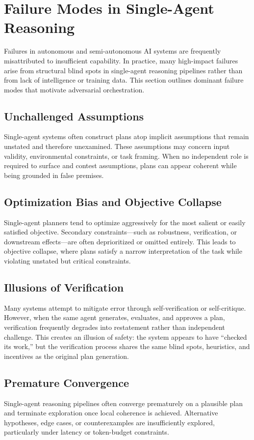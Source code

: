 \section{Failure Modes in Single-Agent Reasoning}

Failures in autonomous and semi-autonomous AI systems are frequently misattributed to insufficient capability. In practice, many high-impact failures arise from structural blind spots in single-agent reasoning pipelines rather than from lack of intelligence or training data. This section outlines dominant failure modes that motivate adversarial orchestration.

\subsection{Unchallenged Assumptions}
Single-agent systems often construct plans atop implicit assumptions that remain unstated and therefore unexamined. These assumptions may concern input validity, environmental constraints, or task framing. When no independent role is required to surface and contest assumptions, plans can appear coherent while being grounded in false premises.

\subsection{Optimization Bias and Objective Collapse}
Single-agent planners tend to optimize aggressively for the most salient or easily satisfied objective. Secondary constraints—such as robustness, verification, or downstream effects—are often deprioritized or omitted entirely. This leads to objective collapse, where plans satisfy a narrow interpretation of the task while violating unstated but critical constraints.

\subsection{Illusions of Verification}
Many systems attempt to mitigate error through self-verification or self-critique. However, when the same agent generates, evaluates, and approves a plan, verification frequently degrades into restatement rather than independent challenge. This creates an illusion of safety: the system appears to have “checked its work,” but the verification process shares the same blind spots, heuristics, and incentives as the original plan generation.

\subsection{Premature Convergence}
Single-agent reasoning pipelines often converge prematurely on a plausible plan and terminate exploration once local coherence is achieved. Alternative hypotheses, edge cases, or counterexamples are insufficiently explored, particularly under latency or token-budget constraints.

